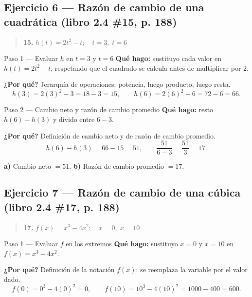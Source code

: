 \documentclass[11pt]{article}
\begin{document}
\subsection*{Ejercicio 6 — Razón de cambio de una cuadrática (libro 2.4 \#15, p. 188)}

\begin{quote}
\textbf{15.} $h(t)=2t^2-t;\quad t=3,\;t=6$
\end{quote}

\begin{paso}{Paso 1 --- Evaluar $h$ en $t=3$ y $t=6$}
\textbf{Qué hago:} sustituyo cada valor en $h(t)=2t^2-t$, respetando que el cuadrado se calcula antes de multiplicar por $2$.

\textbf{¿Por qué?} Jerarquía de operaciones: potencia, luego producto, luego resta.
\[
h(3)=2(3)^2-3=18-3=15,\qquad h(6)=2(6)^2-6=72-6=66.
\]
\end{paso}

\begin{paso}{Paso 2 --- Cambio neto y razón de cambio promedio}
\textbf{Qué hago:} resto $h(6)-h(3)$ y divido entre $6-3$.

\textbf{¿Por qué?} Definición de cambio neto y de razón de cambio promedio.
\[
h(6)-h(3)=66-15=51,\qquad \frac{51}{6-3}=\frac{51}{3}=17.
\]
\end{paso}

\begin{resp}
\textbf{a)} Cambio neto $=51$. \qquad \textbf{b)} Razón de cambio promedio $=17$.
\end{resp}

\subsection*{Ejercicio 7 — Razón de cambio de una cúbica (libro 2.4 \#17, p. 188)}

\begin{quote}
\textbf{17.} $f(x)=x^3-4x^2;\quad x=0,\;x=10$
\end{quote}

\begin{paso}{Paso 1 --- Evaluar $f$ en los extremos}
\textbf{Qué hago:} sustituyo $x=0$ y $x=10$ en $f(x)=x^3-4x^2$.

\textbf{¿Por qué?} Definición de la notación $f(x)$: se reemplaza la variable por el valor dado.
\[
f(0)=0^3-4(0)^2=0,\qquad f(10)=10^3-4(10)^2=1000-400=600.
\]
\end{paso}
\end{document}

